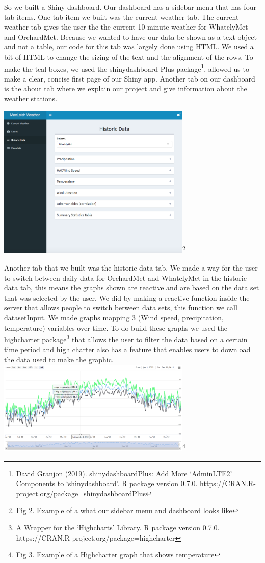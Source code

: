 \documentclass[10pt,letterpaper]{article}
\begin{document}
So we built a Shiny dashboard. Our dashboard has a sidebar menu that has
four tab items. One tab item we built was the current weather tab. The
current weather tab gives the user the the current 10 minute weather for
WhatelyMet and OrchardMet. Because we wanted to have our data be shown
as a text object and not a table, our code for this tab was largely done
using HTML. We used a bit of HTML to change the sizing of the text and
the alignment of the rows. To make the teal boxes, we used the
shinydashboard Plus package\footnote{David Granjon (2019).
  shinydashboardPlus: Add More `AdminLTE2' Components to
  `shinydashboard'. R package version 0.7.0.
  https://CRAN.R-project.org/package=shinydashboardPlus}, allowed us to
make a clear, concise first page of our Shiny app. Another tab on our
dashboard is the about tab where we explain our project and give
information about the weather stations.

\includegraphics[width=3.64583in]{Weather Dashboard.png}\footnote{Fig 2.
  Example of a what our sidebar menu and dashboard looks like}

Another tab that we built was the historic data tab. We made a way for
the user to switch between daily data for OrchardMet and WhatelyMet in
the historic data tab, this means the graphs shown are reactive and are
based on the data set that was selected by the user. We did by making a
reactive function inside the server that allows people to switch between
data sets, this function we call datasetInput. We made graphs mapping 3
(Wind speed, precipitation, temperature) variables over time. To do
build these graphs we used the highcharter package\footnote{A Wrapper
  for the `Highcharts' Library. R package version 0.7.0.
  https://CRAN.R-project.org/package=highcharter} that allows the user
to filter the data based on a certain time period and high charter also
has a feature that enables users to download the data used to make the
graphic. \includegraphics[width=3.64583in]{highchart.png}\footnote{Fig
  3. Example of a Highcharter graph that shows temperature}
\end{document}
